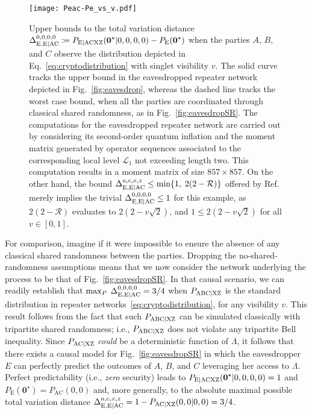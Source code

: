 \documentclass[superscriptaddress,aps,prx,nofootinbib,twocolumn,twoside,reprint,letterpaper,longbibliography]{revtex4-2}
\begin{document}
\begin{figure}[t]
    \texttt{[image: Peac-Pe\_vs\_v.pdf]}
    \caption{Upper bounds to the total variation distance ${\Delta_{\text{E},\text{E{\textbar}AC}}^{0,0,0,0}\coloneqq {P_{\text{E{\textbar}ACXZ}}({\boldsymbol{0}}^\star|0,0,0,0)-P_{\text{E}}({\boldsymbol{0}}^\star)}}$ when the parties $A$, $B$, and $C$ observe the distribution depicted in Eq.~\eqref{eq:cryptodistribution} with singlet visibility $v$.
    The solid curve tracks the upper bound in the eavesdropped repeater network depicted in Fig.~\ref{fig:eavesdrop}, whereas the dashed line tracks the worst case bound, when all the parties are coordinated through classical shared randomness, as in Fig.~\ref{fig:eavesdropSR}.
    The computations for the eavesdropped repeater network are carried out by considering its second-order quantum inflation and the moment matrix generated by operator sequences associated to the corresponding local level $\mathcal{L}_1$ not exceeding length two. This computation results in a moment matrix of size $857\times857$.
    On the other hand, the bound ${\Delta_{\text{E},\text{E{\textbar}AC}}^{a,c,x,z}\leq \min \{1,\; 2(2-\mathcal{R})\}}$ offered by Ref.~\cite{lee2018crypto} merely implies the trivial ${\Delta_{\text{E},\text{E{\textbar}AC}}^{0,0,0,0}\leq 1}$ for this example, as $2(2-\mathcal{R})$ evaluates to $2(2-v\sqrt{2})$, and $1\leq 2(2-v\sqrt{2})$ for all $v\in[0,1]$.}
    \label{fig:cryptoresults}
\end{figure}

For comparison, imagine if it were impossible to ensure the absence of any classical shared randomness between the parties. Dropping the no-shared-randomness assumptions means that we now consider the network underlying the process to be that of Fig.~\ref{fig:eavesdropSR}. In that causal scenario, we can readily establish that ${\max_P\: \Delta^{0,0,0,0}_{\text{E},\text{E{\textbar}AC}}=3/4}$ when $P_{\text{ABC{\textbar}XZ}}$ is the standard distribution in repeater networks~\eqref{eq:cryptodistribution}, for any visibility $v$. This result follows from the fact that such $P_{\text{ABC{\textbar}XZ}}$ can be simulated classically with tripartite shared randomness; i.e., $P_{\text{ABC{\textbar}XZ}}$ does not violate any tripartite Bell inequality. Since $P_{\text{AC{\textbar}XZ}}$ \emph{could} be a deterministic function of $\Lambda$, it follows that there exists a causal model for Fig.~\ref{fig:eavesdropSR} in which the eavesdropper $E$ can perfectly predict the outcomes of $A$, $B$, and $C$ leveraging her access to $\Lambda$. Perfect predictability (i.e., \emph{zero} security) leads to $P_{\text{E{\textbar}ACXZ}}({\boldsymbol{0}}^\star|0,0,0,0)=1$ and $P_\text{E}({\boldsymbol{0}}^\star)=P_\text{AC}(0,0)$ and, more generally, to the absolute maximal possible total variation distance $\Delta_{\text{E},\text{E{\textbar}AC}}^{a,c,x,z}=1-P_{\text{AC{\textbar}XZ}}(0,0|0,0)=3/4$.
\end{document}
